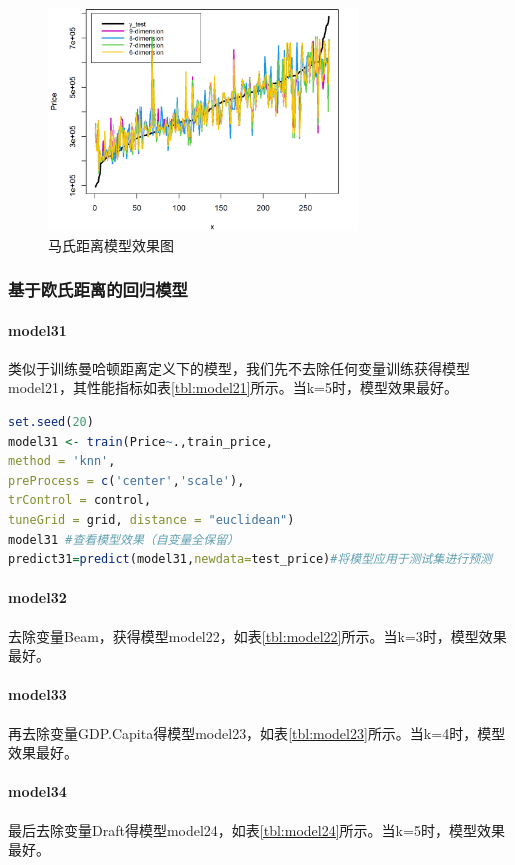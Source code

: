 \documentclass[a4paper,12pt,onecolumn,oneside]{article}
\begin{document}
	\vspace{\baselineskip}
	\begin{figure}[h]
	\centering
	\includegraphics[width=0.73\textwidth]{res/mashi.png}
	\caption{马氏距离模型效果图}
	\label{fig:mashi}
	\end{figure}
	\clearpage
	\subsubsection{基于欧氏距离的回归模型}
	\paragraph{model31}类似于训练曼哈顿距离定义下的模型，我们先不去除任何变量训练获得模型model21，其性能指标如表\ref{tbl:model21}所示。当k=5时，模型效果最好。
\begin{lstlisting}[language=R, caption={knn回归，欧氏距离}, label={lst:5}, belowcaptionskip=0.5\baselineskip]
set.seed(20)
model31 <- train(Price~.,train_price,
method = 'knn',
preProcess = c('center','scale'),
trControl = control,
tuneGrid = grid, distance = "euclidean")
model31 #查看模型效果（自变量全保留）
predict31=predict(model31,newdata=test_price)#将模型应用于测试集进行预测
\end{lstlisting}
	\paragraph{model32}去除变量Beam，获得模型model22，如表\ref{tbl:model22}所示。当k=3时，模型效果最好。
	\paragraph{model33}再去除变量GDP.Capita得模型model23，如表\ref{tbl:model23}所示。当k=4时，模型效果最好。
	\paragraph{model34}最后去除变量Draft得模型model24，如表\ref{tbl:model24}所示。当k=5时，模型效果最好。
	
\end{document}

